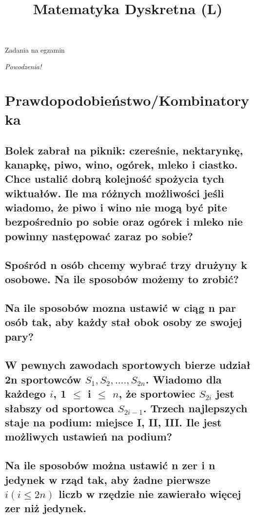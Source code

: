 \documentclass[12pt]{article}
\title{Matematyka Dyskretna (L)}
\begin{document}
\vspace{1cm}

\maketitle
\begin{center}
    
    \Large{Zadania na egzamin}
    
\end{center}

\newpage

\emph{Powodzenia!}

\section{Prawdopodobieństwo/Kombinatoryka}

\subsection{Bolek zabrał na piknik: czereśnie, nektarynkę, kanapkę, piwo, wino, ogórek, mleko i ciastko. Chce ustalić dobrą kolejność spożycia tych wiktuałów. Ile ma różnych możliwości jeśli wiadomo, że piwo i wino nie mogą być pite bezpośrednio po sobie oraz ogórek i mleko nie powinny następować zaraz po sobie?}

\subsection{Spośród n osób chcemy wybrać trzy drużyny k osobowe. Na ile sposobów możemy to zrobić?}

\subsection{Na ile sposobów mozna ustawić w ciąg n par osób tak, aby każdy stał obok osoby ze swojej pary?}

\subsection{W pewnych zawodach sportowych bierze udział 2n sportowców $S_1, S_2,....,S_{2n}$. Wiadomo dla każdego $i$, 1 $\leq$ i $\leq$ $n$, że sportowiec $S_{2i}$ jest słabszy od sportowca $S_{2i-1}$. Trzech najlepszych staje na podium: miejsce I, II, III. Ile jest możliwych ustawień na podium?}

\subsection{Na ile sposobów można ustawić n zer i n jedynek w rząd tak, aby żadne pierwsze $i (i \leq 2n)$ liczb w rzędzie nie zawierało więcej zer niż jedynek.}
\end{document}
